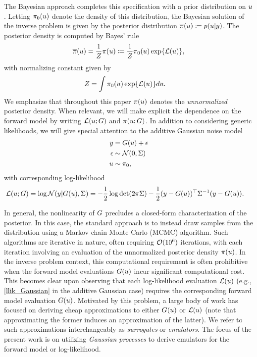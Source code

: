 \documentclass[12pt]{article}
\begin{document}
The Bayesian approach completes this specification with a prior distribution 
on $u$. Letting $\pi_0(u)$ denote the density of this distribution, the Bayesian solution of the inverse problem is given 
by the posterior distribution $\overline{\pi}(u) \coloneqq p(u | y)$. The posterior density is computed by Bayes' rule 
\begin{align}
\overline{\pi}(u) = \frac{1}{Z}\pi(u) \coloneqq \frac{1}{Z} \pi_0(u) \exp\mathopen{}\left\{\mathcal{L}(u)\right\}\mathclose{}, \label{post_dens}
\end{align}
with normalizing constant given by 
\begin{align}
Z &= \int \pi_0(u) \exp\mathopen{}\left\{\mathcal{L}(u)\right\}\mathclose{} du. \label{norm_cst}
\end{align}
We emphasize that throughout this paper $\pi(u)$ denotes the \textit{unnormalized} 
posterior density. When relevant, we will make explicit the dependence on the forward 
model by writing $\mathcal{L}(u; G)$ and $\pi(u; G)$. In addition to considering 
generic likelihoods, we will give special attention to the additive Gaussian noise model
\begin{align}
y &= G(u) + \epsilon \label{inv_prob_Gaussian} \\
\epsilon &\sim \mathcal{N}(0, \Sigma) \nonumber \\
u &\sim \pi_0 \nonumber, 
\end{align}
with corresponding log-likelihood 
\begin{align}
\mathcal{L}(u; G) &= \log\mathcal{N}(y| G(u), \Sigma) 
= -\frac{1}{2} \log\det (2\pi \Sigma) - \frac{1}{2} (y - G(u))^\top \Sigma^{-1} (y - G(u)). \label{llik_Gaussian}
\end{align}

In general, the nonlinearity of $G$ precludes a closed-form characterization of the posterior. In this case, the 
standard approach is to instead draw samples from the distribution using a Markov chain Monte Carlo (MCMC) 
algorithm. Such algorithms are iterative in nature, often requiring $\mathcal{O}(10^6)$ iterations, with each 
iteration involving an evaluation of the unnormalized posterior density $\pi(u)$. In the inverse problem 
context, this computational requirement is often prohibitive when the forward model evaluations $G(u)$
incur significant computational cost. This becomes clear upon observing that each log-likelihood evaluation 
$\mathcal{L}(u)$ (e.g., \ref{llik_Gaussian} in the additive Gaussian case) requires the corresponding forward 
model evaluation $G(u)$. Motivated by this problem, a large body of work has focused on deriving 
cheap approximations to either $G(u)$ or $\mathcal{L}(u)$ (note that approximating the former induces 
an approximation of the latter). We refer to such approximations interchangeably 
as \textit{surrogates} or \textit{emulators}. The focus of the present work is on utilizing \textit{Gaussian processes} 
to derive emulators for the forward model or log-likelihood. 
\end{document}
